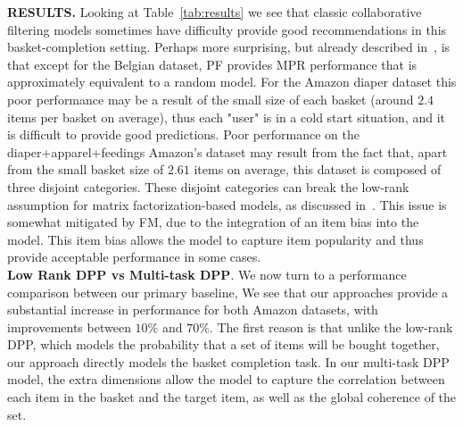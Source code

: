 \noindent
\textbf{RESULTS.} Looking at Table~\ref{tab:results} we see that classic
collaborative filtering models sometimes have difficulty provide good
recommendations in this basket-completion setting. Perhaps more surprising, but
already described in~\cite{DBLP:conf/aaai/GartrellPK17}, is that except for the
Belgian dataset, PF provides MPR performance that is approximately equivalent to
a random model. For the Amazon diaper dataset this poor performance may be a
result of the small size of each basket (around $2.4$ items per basket on
average), thus each "user" is in a cold start situation, and it is difficult to
provide good predictions. Poor performance on the diaper+apparel+feedings
Amazon's dataset may result from the fact that, apart from the small basket size
of $2.61$ items on average, this dataset is composed of three disjoint
categories.  These disjoint categories can break the low-rank assumption for
matrix factorization-based models, as discussed
in~\cite{DBLP:conf/recsys/GartrellPK16}. This issue is somewhat mitigated by FM,
due to the integration of an item bias into the model.  This item bias allows
the model to capture item popularity and thus provide acceptable performance in
some cases.
\\
\noindent
\textbf{Low Rank DPP vs Multi-task DPP}.
We now turn to a performance comparison between our primary baseline, 
We see that our approaches
provide a substantial increase in performance for both Amazon datasets, with
improvements between $10\%$ and $70\%$. The first reason is that unlike the low-rank
DPP, which models the probability that a set of items will be bought together, our
approach directly models the basket completion task. In our multi-task
DPP model, the extra dimensions allow the model to capture the correlation between each item in
the basket and the target item, as well as the global coherence of the set.

